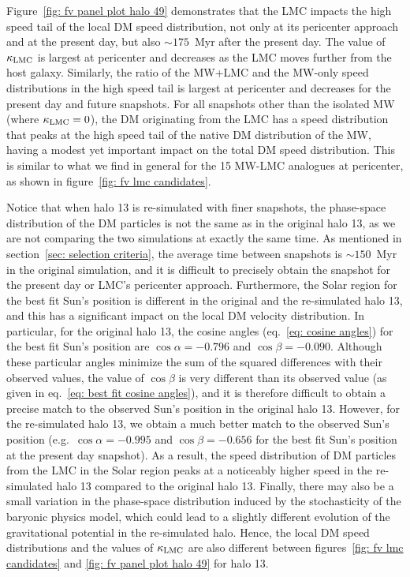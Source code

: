 Figure~\ref{fig: fv panel plot halo 49} demonstrates that the LMC impacts the high speed tail of the local DM speed distribution, not only at its pericenter approach and at the present day, but also $\sim 175$~Myr after the present day. The value of $\kappa_{\rm LMC}$ is largest at pericenter and decreases as the LMC moves further from the host galaxy. Similarly, the ratio of the MW+LMC and the MW-only speed distributions in the high speed tail is largest at pericenter and decreases for the present day and future snapshots. For all  snapshots other than the isolated MW  (where $\kappa_{\rm LMC}=0$), the DM originating from the LMC has a speed distribution that peaks at the high speed tail of the native DM distribution of the MW, having a modest yet important impact on the total DM speed distribution. This is  similar to what we find in general for the 15 MW-LMC analogues at pericenter, as shown in figure~\ref{fig: fv lmc candidates}. 

Notice that when halo 13 is re-simulated with finer snapshots, the phase-space distribution of the DM particles  is not the same as in the original halo 13, as we are not comparing the two simulations at exactly the same time. As mentioned in section~\ref{sec: selection criteria}, the average time between snapshots is $\sim 150$~Myr in the original simulation, and it is difficult to precisely obtain the snapshot for the present day or LMC's pericenter approach. Furthermore, the Solar region for the best fit Sun's position is different in the original and the re-simulated halo 13, and this has a significant impact on the local DM velocity distribution. In particular, for the original halo 13, the cosine angles (eq.~\eqref{eq: cosine angles}) for the best fit Sun's position are $\cos \alpha=-0.796$ and $\cos\beta=-0.090$. Although these particular angles minimize the sum of the squared differences with their observed values, the value of $\cos\beta$ is very different than its observed value (as given in eq.~\eqref{eq: best fit cosine angles}), and it is therefore difficult to obtain a precise match to the observed Sun's position in the original halo 13. However, for the re-simulated halo 13, we obtain a much better match to the observed Sun's position (e.g.~$\cos \alpha=-0.995$ and $\cos\beta=-0.656$ for the best fit Sun's position at the present day snapshot). As a result, the speed distribution of DM particles from the LMC in the Solar region peaks at a noticeably higher speed in the re-simulated halo 13 compared to the original halo 13. Finally, there may also be a small variation in the phase-space distribution induced by the stochasticity of the baryonic physics model, which could lead to a slightly different evolution of the gravitational potential in the re-simulated halo. Hence, the local DM speed distributions and the values of  $\kappa_{\rm LMC}$  are also different between figures~\ref{fig: fv lmc candidates} and \ref{fig: fv panel plot halo 49} for halo 13. 

